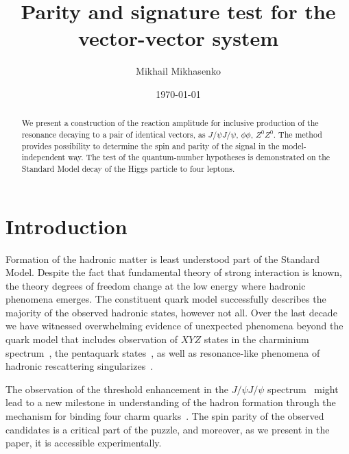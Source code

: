 \documentclass[prd,preprintnumbers,floatfix,
nofootinbib,superscriptaddress]{revtex4}
\begin{document}
\title{Parity and signature test for the vector-vector system}

\author{Mikhail Mikhasenko}

\date{\today}

\begin{abstract}
  We present a construction of the reaction amplitude
  for inclusive production of the resonance decaying to a pair of identical vectors, as $J/\psi J/\psi$, $\phi\phi$, $Z^0 Z^0$.
  The method provides possibility to determine the spin and parity of the signal in the model-independent way.
  The test of the quantum-number hypotheses is demonstrated on the Standard Model decay of the Higgs particle to four leptons.
\end{abstract}

\nopagebreak
\maketitle

%
\section{Introduction}

Formation of the hadronic matter is least understood part of the Standard Model.
Despite the fact that fundamental theory of strong interaction is known,
the theory degrees of freedom change at the low energy where hadronic phenomena emerges.
The constituent quark model successfully describes the majority of the observed hadronic states, however not all. Over the last decade we have witnessed overwhelming evidence of unexpected phenomena beyond the quark model that includes observation
of $XYZ$ states in the charminium spectrum~\cite{Godfrey:2008nc}, the pentaquark states~\cite{Aaij:2015tga,Aaij:2019vzc},
as well as resonance-like phenomena of hadronic rescattering singularizes~\cite{Alexeev:2020lvq}.

The observation of the threshold enhancement in the $J/\psi J/\psi$ spectrum~\cite{Aaij:2020xyz}
might lead to a new milestone in understanding of the hadron formation
through the mechanism for binding four charm quarks~\cite{Liu:2019zoy}.
The spin parity of the observed candidates is a critical part of the puzzle,
and moreover, as we present in the paper, it is accessible experimentally.
\end{document}
